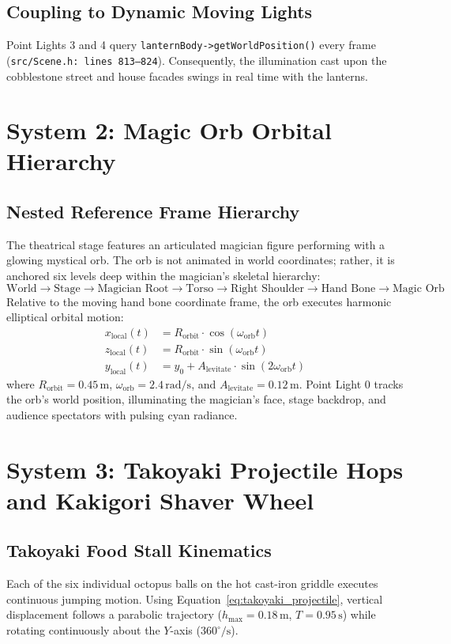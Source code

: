 \subsection{Coupling to Dynamic Moving Lights}
Point Lights 3 and 4 query \texttt{lanternBody->getWorldPosition()} every frame (\texttt{src/Scene.h: lines 813--824}). Consequently, the illumination cast upon the cobblestone street and house facades swings in real time with the lanterns.

\section{System 2: Magic Orb Orbital Hierarchy}
\subsection{Nested Reference Frame Hierarchy}
The theatrical stage features an articulated magician figure performing with a glowing mystical orb. The orb is not animated in world coordinates; rather, it is anchored six levels deep within the magician's skeletal hierarchy:
\begin{equation}
\text{World} \to \text{Stage} \to \text{Magician Root} \to \text{Torso} \to \text{Right Shoulder} \to \text{Hand Bone} \to \text{Magic Orb}
\end{equation}
Relative to the moving hand bone coordinate frame, the orb executes harmonic elliptical orbital motion:
\begin{equation}
\begin{aligned}
x_{\text{local}}(t) &= R_{\text{orbit}} \cdot \cos(\omega_{\text{orb}} t) \\
z_{\text{local}}(t) &= R_{\text{orbit}} \cdot \sin(\omega_{\text{orb}} t) \\
y_{\text{local}}(t) &= y_0 + A_{\text{levitate}} \cdot \sin(2\omega_{\text{orb}} t)
\end{aligned}
\end{equation}
where $R_{\text{orbit}} = 0.45\,\text{m}$, $\omega_{\text{orb}} = 2.4\,\text{rad/s}$, and $A_{\text{levitate}} = 0.12\,\text{m}$.
Point Light 0 tracks the orb's world position, illuminating the magician's face, stage backdrop, and audience spectators with pulsing cyan radiance.

\section{System 3: Takoyaki Projectile Hops and Kakigori Shaver Wheel}
\subsection{Takoyaki Food Stall Kinematics}
Each of the six individual octopus balls on the hot cast-iron griddle executes continuous jumping motion. Using Equation~\ref{eq:takoyaki_projectile}, vertical displacement follows a parabolic trajectory ($h_{\text{max}} = 0.18\,\text{m}$, $T = 0.95\,\text{s}$) while rotating continuously about the $Y$-axis ($360^\circ/\text{s}$).


